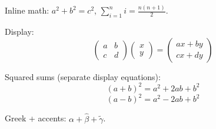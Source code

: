 \documentclass{article}
\begin{document}
Inline math: $a^2 + b^2 = c^2$, $\sum_{i=1}^n i = \frac{n(n+1)}{2}$.

Display:
\[
\begin{pmatrix} a & b \\ c & d \end{pmatrix}
\begin{pmatrix} x \\ y \end{pmatrix}
=
\begin{pmatrix} ax + by \\ cx + dy \end{pmatrix}
\]

Squared sums (separate display equations):
\[
    (a + b)^2 = a^2 + 2ab + b^2
\]
\[
    (a - b)^2 = a^2 - 2ab + b^2
\]

Greek + accents: $\alpha + \hat{\beta} + \tilde{\gamma}$.
\end{document}
